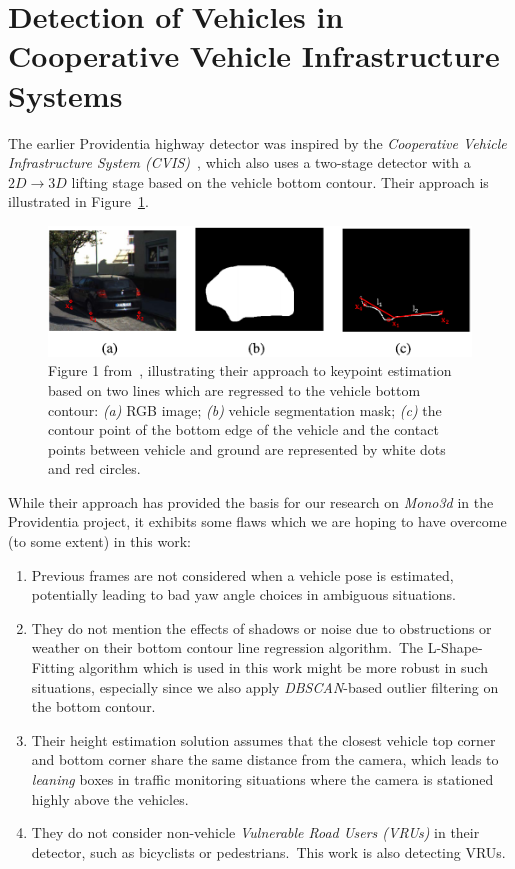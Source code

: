 \section{Detection of Vehicles in Cooperative Vehicle Infrastructure Systems}
\label{sec:related-coopvis}

The earlier Providentia highway detector was inspired by the \textit{Cooperative Vehicle Infrastructure System (CVIS)}~\cite{guo2021detection}, which also uses a two-stage detector with a $2D \rightarrow 3D$ lifting stage based on the vehicle bottom contour.
Their approach is illustrated in Figure~\ref{fig:related-cvis}.

\begin{figure}[htb]
    \centering
    \includegraphics[width=1.0\linewidth]{figures/cvis_figure}
    \caption{Figure 1 from~\cite{guo2021detection}, illustrating their approach to keypoint estimation based on two lines which are regressed to the vehicle bottom contour: \textit{(a)} RGB image; \textit{(b)} vehicle segmentation mask; \textit{(c)} the contour point of the bottom edge of the vehicle and the contact points between vehicle and ground are represented by white dots and red circles.}
    \label{fig:related-cvis}
\end{figure}

While their approach has provided the basis for our research on \textit{Mono3d} in the Providentia project, it exhibits some flaws which we are hoping to have overcome (to some extent) in this work:

\begin{enumerate}
    \item Previous frames are not considered when a vehicle pose is estimated, potentially leading to bad yaw angle choices in ambiguous situations.
    \item They do not mention the effects of shadows or noise due to obstructions or weather on their bottom contour line regression algorithm.\ The L-Shape-Fitting algorithm which is used in this work might be more robust in such situations, especially since we also apply \textit{DBSCAN}-based outlier filtering on the bottom contour.
    \item Their height estimation solution assumes that the closest vehicle top corner and bottom corner share the same distance from the camera, which leads to \textit{leaning} boxes in traffic monitoring situations where the camera is stationed highly above the vehicles.
    \item They do not consider non-vehicle \textit{Vulnerable Road Users (VRUs)} in their detector, such as bicyclists or pedestrians.\ This work is also detecting VRUs.
\end{enumerate}

